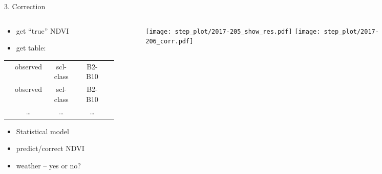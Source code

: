 \begin{frame}[t]{3. Correction}
    \begin{columns}
        \begin{column}{0.45\textwidth}
            \begin{itemize}
                \item get ``true'' NDVI
                \item get table:
            \end{itemize}

            \scriptsize
            \begin{tabular}{| c |  c c c c |}
                \hline
                \color{myred}{``truth''} & observed & scl-class & B2-B10 & \color{mygray}{weather} \\
                \color{myred}{``truth''} & observed & scl-class & B2-B10 & \color{mygray}{weather} \\
                \color{myred}{\dots    } & \dots    & \dots     & \dots  & \color{mygray}{\dots}   \\
            \end{tabular}\normalsize \vspace{0.5cm}
            \begin{itemize}
                \item Statistical model
                \item predict/correct NDVI
                \item weather -- yes or no?
            \end{itemize}
        \end{column}
        \begin{column}{0.42\textwidth}
            \begin{figure}
                \vspace{-1.8cm}
                \texttt{[image: step\_plot/2017-205\_show\_res.pdf]}
                \texttt{[image: step\_plot/2017-206\_corr.pdf]}
            \end{figure}
        \end{column}
    \end{columns}
\end{frame}

